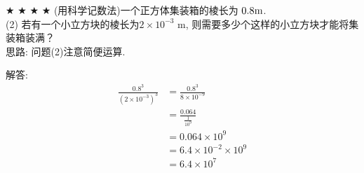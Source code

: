 \item {
    $\bigstar$ $\bigstar$ $\bigstar$ $\bigstar$
    (用科学记数法)一个正方体集装箱的棱长为 $0. 8 \rm{m}$. \\
    (2) 若有一个小立方块的棱长为$2\times 10^{-3} $ m, 则需要多少个这样的小立方块才能将集装箱装满？
    \ifshowSolution
    \fangsong{}
    \\
    思路: 问题(2)注意简便运算. 

    解答:
    \begin{align*}
        \frac{0. 8^3} {(2\times 10^{-3})^3} &= \frac{0. 8^3} {8\times 10^{-9}}\\
        &= \frac{0. 064} {\frac{1}{10^9}}\\
        &= 0. 064\times 10^9\\
        &= 6. 4\times 10^{-2}\times 10^9\\
        &= 6. 4\times 10^7\\
    \end{align*}
    \else
        \\ \\ \\
    \fi
}

\begin{comment}
    \item {
        (把 $\frac{1}{27}$ 化为以3为底的幂) 若$3^{x-1}=\frac{1}{27}$, 求$x$. 
        \\ \\ \\
    }
\end{comment}
    
\begin{comment}
\item {
    (注意: 除号使用分数形式) 已知$a^{2n}=3, a^{3m}=5$, 求$a^{6n-9m}$. 
    \ifshowSolution
    \fangsong\zihao{4}
    \\
    思路: 将$a^{6n-9m}$凑出$a^{2n}, a^{3m}$, 直接代入计算. 结果使用分数形式即可. 

    解答: 
    \begin{align*}
        a^{6n-9m} &= \frac{a^{6n}}{a^{9m}}\\
        &= \frac{(a^{2n})^3} {(a^{3m})^3}\\
        &= \frac{3^3} {5^3}\\
        &= \frac{27} {125}. 
    \end{align*}
    \else
        \\ \\ \\
    \fi
}
\end{comment}

